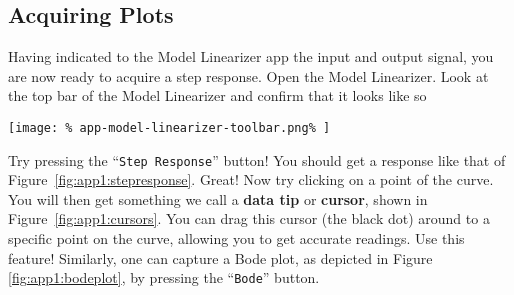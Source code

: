 \FloatBarrier
\subsection{Acquiring Plots}
\label{App:Simulink:ModelLinearizer:3}
Having indicated to the Model Linearizer app the input and output signal, you
are now ready to acquire a step response. Open the Model Linearizer. Look at
the top bar of the Model Linearizer and confirm that it looks like so
%
\begin{center}
  \texttt{[image: \%
    app-model-linearizer-toolbar.png\%
  ]}
\end{center}
%
Try pressing the ``\texttt{Step Response}'' button! You should get a response
like that of Figure~\ref{fig:app1:stepresponse}. Great! Now try clicking
on a point of the curve. You will then get something we call a \textbf{data
tip} or \textbf{cursor}, shown in Figure~\ref{fig:app1:cursors}.
You can drag this cursor (the black dot) around to a specific point on the
curve, allowing you to get accurate readings. Use this feature!
%
Similarly, one can capture a Bode plot, as depicted in Figure
\ref{fig:app1:bodeplot}, by pressing the ``\texttt{Bode}'' button.

